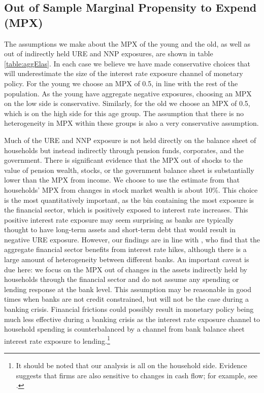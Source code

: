 \documentclass[titlepage]{\econtex}\newcommand{\texname}{ConsumptionHeterogeneity}
\begin{document}
\subsection{Out of Sample Marginal Propensity to Expend (MPX)}
The assumptions we make about the MPX of the young and the old, as well as out of indirectly held URE and NNP exposures, are shown in table \ref{table:aggElas}. In each case we believe we have made conservative choices that will underestimate the size of the interest rate exposure channel of monetary policy. For the young we choose an MPX of 0.5, in line with the rest of the population. As the young have aggregate negative exposures, choosing an MPX on the low side is conservative. Similarly, for the old we choose an MPX of 0.5, which is on the high side for this age group. The assumption that there is no heterogeneity in MPX within these groups is also a very conservative assumption.

\begin{center}
	\label{table:aggElas}
	
\end{center}

Much of the URE and NNP exposure is not held directly on the balance sheet of households but instead indirectly through pension funds, corporates, and the government. There is significant evidence that the MPX out of shocks to the value of pension wealth, stocks, or the government balance sheet is substantially lower than the MPX from income. We choose to use the estimate from \cite{maggio_stock_2018} that households' MPX from changes in stock market wealth is about 10\%. This choice is the most quantitatively important, as the bin containing the most exposure is the financial sector, which is positively exposed to interest rate increases. This positive interest rate exposure may seem surprising as banks are typically thought to have long-term assets and short-term debt that would result in negative URE exposure. However, our findings are in line with \cite{landier_banks_2013}, who find that the aggregate financial sector benefits from interest rate hikes, although there is a large amount of heterogeneity between different banks. An important caveat is due here: we focus on the MPX out of changes in the assets indirectly held by households through the financial sector and do not assume any spending or lending response at the bank level. This assumption may be reasonable in good times when banks are not credit constrained, but will not be the case during a banking crisis. Financial frictions could possibly result in monetary policy being much less effective during a banking crisis as the interest rate exposure channel to household spending is counterbalanced by a channel from bank balance sheet interest rate exposure to lending.\footnote{It should be noted that our analysis is all on the household side. Evidence suggests that firms are also sensitive to changes in cash flow; for example, see \cite{blanchard_what_1994}.} 
\end{document}
